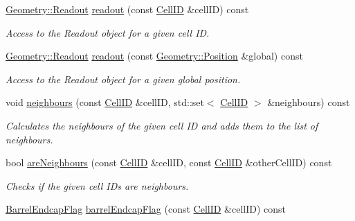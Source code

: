 \begin{DoxyCompactItemize}
\hyperlink{class_d_d4hep_1_1_geometry_1_1_readout}{Geometry::Readout} \hyperlink{class_d_d4hep_1_1_d_d_rec_1_1_i_d_decoder_ad0051c41f1ab387fb18167d9b04af228}{readout} (const \hyperlink{namespace_d_d4hep_1_1_d_d_rec_af5cecc2e566eeaedb430b92df23971d4}{CellID} \&cellID) const 
\begin{DoxyCompactList}\small\item\em Access to the Readout object for a given cell ID. \item\end{DoxyCompactList}\item 
\hyperlink{class_d_d4hep_1_1_geometry_1_1_readout}{Geometry::Readout} \hyperlink{class_d_d4hep_1_1_d_d_rec_1_1_i_d_decoder_a961907399c9abbd109fc65639293ddfc}{readout} (const \hyperlink{namespace_d_d4hep_1_1_geometry_a55083902099d03506c6db01b80404900}{Geometry::Position} \&global) const 
\begin{DoxyCompactList}\small\item\em Access to the Readout object for a given global position. \item\end{DoxyCompactList}\item 
void \hyperlink{class_d_d4hep_1_1_d_d_rec_1_1_i_d_decoder_a410a09ded8a10fb587255ada3910d849}{neighbours} (const \hyperlink{namespace_d_d4hep_1_1_d_d_rec_af5cecc2e566eeaedb430b92df23971d4}{CellID} \&cellID, std::set$<$ \hyperlink{namespace_d_d4hep_1_1_d_d_rec_af5cecc2e566eeaedb430b92df23971d4}{CellID} $>$ \&neighbours) const 
\begin{DoxyCompactList}\small\item\em Calculates the neighbours of the given cell ID and adds them to the list of neighbours. \item\end{DoxyCompactList}\item 
bool \hyperlink{class_d_d4hep_1_1_d_d_rec_1_1_i_d_decoder_af88688b8d23dd00a82a7b5c938cb2cb8}{areNeighbours} (const \hyperlink{namespace_d_d4hep_1_1_d_d_rec_af5cecc2e566eeaedb430b92df23971d4}{CellID} \&cellID, const \hyperlink{namespace_d_d4hep_1_1_d_d_rec_af5cecc2e566eeaedb430b92df23971d4}{CellID} \&otherCellID) const 
\begin{DoxyCompactList}\small\item\em Checks if the given cell IDs are neighbours. \item\end{DoxyCompactList}\item 
\hyperlink{class_d_d4hep_1_1_d_d_rec_1_1_i_d_decoder_1_1_barrel_endcap_flag}{BarrelEndcapFlag} \hyperlink{class_d_d4hep_1_1_d_d_rec_1_1_i_d_decoder_adce672d88469b43ba90d51e24ce85490}{barrelEndcapFlag} (const \hyperlink{namespace_d_d4hep_1_1_d_d_rec_af5cecc2e566eeaedb430b92df23971d4}{CellID} \&cellID) const 

\end{DoxyCompactItemize}
